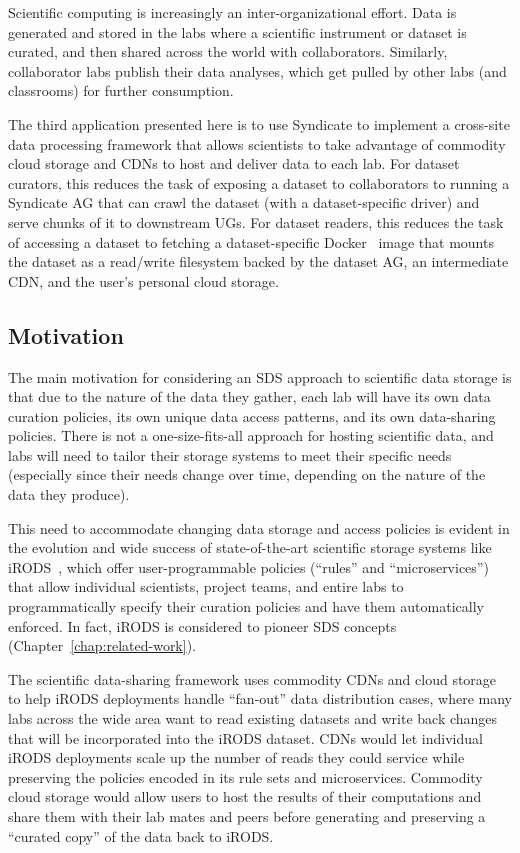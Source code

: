 Scientific computing is increasingly an inter-organizational effort.  Data is
generated and stored in the labs where a scientific instrument or dataset is
curated, and then shared across the world with collaborators.  Similarly,
collaborator labs publish their data analyses, which get pulled by other labs
(and classrooms) for further consumption.

The third application presented here is to use 
Syndicate to implement a cross-site data processing framework that
allows scientists to take advantage of commodity cloud storage and CDNs to host
and deliver data to each lab.  For dataset curators, this reduces the task of
exposing a dataset to collaborators to running a Syndicate AG that can crawl the
dataset (with a dataset-specific driver) and serve chunks of it to downstream
UGs.  For dataset readers, this reduces the task of accessing a dataset to
fetching a dataset-specific Docker~\cite{docker} image that mounts the dataset
as a read/write filesystem backed by the dataset AG, an intermediate CDN, and
the user's personal cloud storage.

\subsection{Motivation}

The main motivation for considering an SDS approach to scientific data storage is
that due to the nature of the data they gather, each lab will have its own data curation
policies, its own unique data access patterns, and its own data-sharing policies.
There is not a one-size-fits-all approach for hosting scientific data, and labs will need to tailor
their storage systems to meet their specific needs (especially since their needs
change over time, depending on the nature of the data they produce).

This need to accommodate changing data storage and access policies is evident in
the evolution and wide success of state-of-the-art scientific storage systems
like iRODS~\cite{irods}, which offer
user-programmable policies (``rules'' and ``microservices'') that allow
individual scientists, project teams, and entire labs to programmatically
specify their curation policies and have them automatically enforced.
In fact, iRODS is considered to pioneer SDS concepts
(Chapter~\ref{chap:related-work}).

The scientific data-sharing framework uses commodity CDNs and cloud storage to help iRODS deployments
handle ``fan-out'' data distribution cases, where many labs across the wide
area want to read existing datasets and write back changes that will be
incorporated into the iRODS dataset.  CDNs would let individual iRODS
deployments scale up the number of reads they could service while preserving the
policies encoded in its rule sets and microservices.  Commodity cloud
storage would allow users to host the results of their computations and share
them with their lab mates and peers before generating and preserving a
``curated copy'' of the data back to iRODS.

